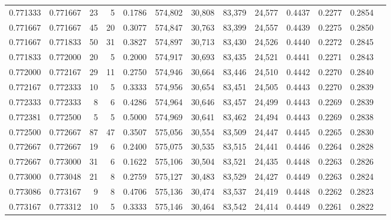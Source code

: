 \begin{tabular}{rrrrrrrrrrrrr}
0.771333 & 0.771667 &    23 &   5 &                                     0.1786 & 574,802 &  30,808 &  83,379 &  24,577 & 0.4437 & 0.2277 & 0.2854 \\
0.771667 & 0.771667 &    45 &  20 &                                     0.3077 & 574,847 &  30,763 &  83,399 &  24,557 & 0.4439 & 0.2275 & 0.2850 \\
0.771667 & 0.771833 &    50 &  31 &                                     0.3827 & 574,897 &  30,713 &  83,430 &  24,526 & 0.4440 & 0.2272 & 0.2845 \\
0.771833 & 0.772000 &    20 &   5 &                                     0.2000 & 574,917 &  30,693 &  83,435 &  24,521 & 0.4441 & 0.2271 & 0.2843 \\
0.772000 & 0.772167 &    29 &  11 &                                     0.2750 & 574,946 &  30,664 &  83,446 &  24,510 & 0.4442 & 0.2270 & 0.2840 \\
0.772167 & 0.772333 &    10 &   5 &                                     0.3333 & 574,956 &  30,654 &  83,451 &  24,505 & 0.4443 & 0.2270 & 0.2839 \\
0.772333 & 0.772333 &     8 &   6 &                                     0.4286 & 574,964 &  30,646 &  83,457 &  24,499 & 0.4443 & 0.2269 & 0.2839 \\
0.772381 & 0.772500 &     5 &   5 &                                     0.5000 & 574,969 &  30,641 &  83,462 &  24,494 & 0.4443 & 0.2269 & 0.2838 \\
0.772500 & 0.772667 &    87 &  47 &                                     0.3507 & 575,056 &  30,554 &  83,509 &  24,447 & 0.4445 & 0.2265 & 0.2830 \\
0.772667 & 0.772667 &    19 &   6 &                                     0.2400 & 575,075 &  30,535 &  83,515 &  24,441 & 0.4446 & 0.2264 & 0.2828 \\
0.772667 & 0.773000 &    31 &   6 &                                     0.1622 & 575,106 &  30,504 &  83,521 &  24,435 & 0.4448 & 0.2263 & 0.2826 \\
0.773000 & 0.773048 &    21 &   8 &                                     0.2759 & 575,127 &  30,483 &  83,529 &  24,427 & 0.4449 & 0.2263 & 0.2824 \\
0.773086 & 0.773167 &     9 &   8 &                                     0.4706 & 575,136 &  30,474 &  83,537 &  24,419 & 0.4448 & 0.2262 & 0.2823 \\
0.773167 & 0.773312 &    10 &   5 &                                     0.3333 & 575,146 &  30,464 &  83,542 &  24,414 & 0.4449 & 0.2261 & 0.2822 \\

\end{tabular}
